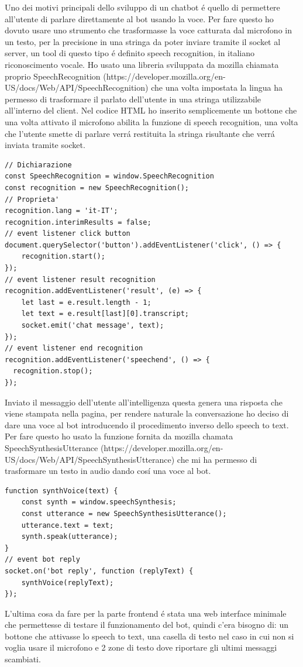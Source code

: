Uno dei motivi principali dello sviluppo di un chatbot \'e quello di permettere all'utente di parlare direttamente al bot usando la voce. Per fare questo ho dovuto usare uno strumento che trasformasse la voce catturata dal microfono in un testo, per la precisione in una stringa da poter inviare tramite il socket al server, un tool di questo tipo \'e definito speech recognition, in italiano riconoscimento vocale.
Ho usato una libreria sviluppata da mozilla chiamata proprio SpeechRecognition (https://developer.mozilla.org/en-US/docs/Web/API/SpeechRecognition) che una volta impostata la lingua ha permesso di trasformare il parlato dell'utente in una stringa utilizzabile all'interno del client. 
Nel codice HTML ho inserito semplicemente un bottone che una volta attivato il microfono abilita la funzione di speech recognition, una volta che l'utente smette di parlare verr\'a restituita la stringa risultante che verr\'a inviata tramite socket.
\begin{lstlisting}
// Dichiarazione
const SpeechRecognition = window.SpeechRecognition
const recognition = new SpeechRecognition();
// Proprieta'
recognition.lang = 'it-IT';
recognition.interimResults = false;
// event listener click button
document.querySelector('button').addEventListener('click', () => {
    recognition.start();
});
// event listener result recognition
recognition.addEventListener('result', (e) => {
    let last = e.result.length - 1; 
    let text = e.result[last][0].transcript;
    socket.emit('chat message', text);
});
// event listener end recognition
recognition.addEventListener('speechend', () => {
  recognition.stop();
});
\end{lstlisting}
Inviato il messaggio dell'utente all'intelligenza questa genera una risposta che viene stampata nella pagina, per rendere naturale la conversazione ho deciso di dare una voce al bot introducendo il procedimento inverso dello speech to text. Per fare questo ho usato la funzione fornita da mozilla chamata SpeechSynthesisUtterance (https://developer.mozilla.org/en-US/docs/Web/API/SpeechSynthesisUtterance) che mi ha permesso di trasformare un testo in audio dando cos\'i una voce al bot.
\begin{lstlisting}
function synthVoice(text) {
    const synth = window.speechSynthesis;
    const utterance = new SpeechSynthesisUtterance();
    utterance.text = text;
    synth.speak(utterance);
}
// event bot reply
socket.on('bot reply', function (replyText) {
    synthVoice(replyText);
});
\end{lstlisting}
L'ultima cosa da fare per la parte frontend \'e stata una web interface minimale che permettesse di testare il funzionamento del bot, quindi c'era bisogno di: un bottone che attivasse lo speech to text, una casella di testo nel caso in cui non si voglia usare il microfono e 2 zone di testo dove riportare gli ultimi messaggi scambiati.
